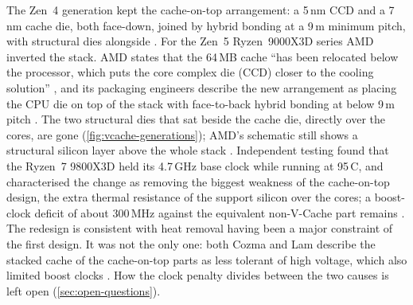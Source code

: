 The Zen~4 generation kept the cache-on-top arrangement: a 5\,nm CCD and a 7\,nm cache die, both face-down, joined by hybrid bonding at a 9\,\textmu m minimum pitch, with structural dies alongside \cite{alam2ndGeneration3D2024}. For the Zen~5 Ryzen~9000X3D series AMD inverted the stack. AMD states that the 64\,MB cache ``has been relocated below the processor, which puts the core complex die (CCD) closer to the cooling solution'' \cite{advancedmicrodevicesinc.GamingLegendContinues2024}, and its packaging engineers describe the new arrangement as placing the CPU die on top of the stack with face-to-back hybrid bonding at below 9\,\textmu m pitch \cite[slides~6--7]{lambertHeterogenousIntegrationHigh2025}. The two structural dies that sat beside the cache die, directly over the cores, are gone (\cref{fig:vcache-generations}); AMD's schematic still shows a structural silicon layer above the whole stack \cite[slide~7]{lambertHeterogenousIntegrationHigh2025}. Independent testing found that the Ryzen~7 9800X3D held its 4.7\,GHz base clock while running at 95\,\textdegree C, and characterised the change as removing the biggest weakness of the cache-on-top design, the extra thermal resistance of the support silicon over the cores; a boost-clock deficit of about 300\,MHz against the equivalent non-V-Cache part remains \cite{cozmaAMDs9800X3D2nd2024}. The redesign is consistent with heat removal having been a major constraint of the first design. It was not the only one: both Cozma and Lam describe the stacked cache of the cache-on-top parts as less tolerant of high voltage, which also limited boost clocks \cite{cozmaAMDs9800X3D2nd2024,lamAMDs7950X3DZen2023}. How the clock penalty divides between the two causes is left open (\cref{sec:open-questions}).

